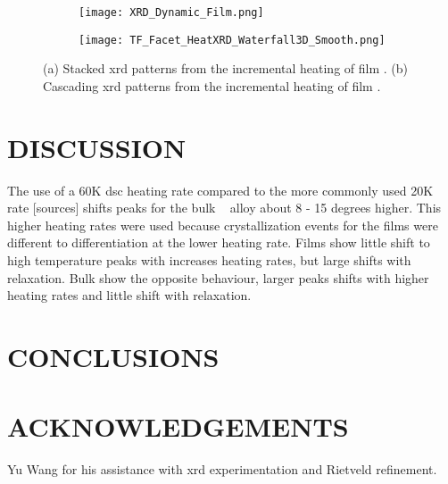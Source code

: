\documentclass[a4paper,12pt,oneside]{article}%
\begin{document}
\begin{figure}[b]
	\centering
	\begin{subfigure}[htbp]{0.75\textwidth}
		\texttt{[image: XRD\_Dynamic\_Film.png]}
		\caption{}
		\label{fig:XRD_Dynamic_FullStack_Film}
	\end{subfigure}
	\begin{subfigure}[htbp]{0.75\textwidth}
		\texttt{[image: TF\_Facet\_HeatXRD\_Waterfall3D\_Smooth.png]}
		\caption{}
		\label{fig:XRD_Dynamic_WaterFall_Film}
	\end{subfigure}
	\caption{(a) Stacked \gls{xrd} patterns from the incremental heating of film \MgZnCa. (b) Cascading \gls{xrd} patterns from the incremental heating of film \MgZnCa. }%
	\label{fig:XRD_Dynamic_Film}
\end{figure}


\section{DISCUSSION}

The use of a 60K \gls{dsc} heating rate compared to the more commonly used 20K rate [sources] shifts peaks for the bulk \MgZnCa~ alloy about 8 - 15 degrees higher. This higher heating rates were used because crystallization events for the films were different to differentiation at the lower heating rate. 
Films show little shift to high temperature peaks with increases heating rates, but large shifts with relaxation. 
Bulk show the opposite behaviour, larger peaks shifts with higher heating rates and little shift with relaxation.


\section{CONCLUSIONS}


\section{ACKNOWLEDGEMENTS}

Yu Wang for his assistance with \acrshort{xrd} experimentation and Rietveld refinement. 





\end{document}
